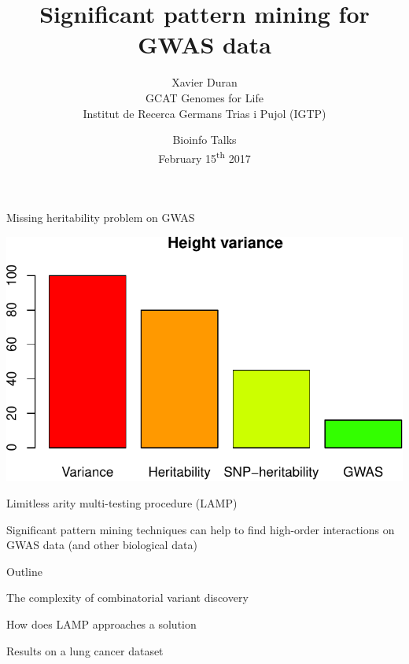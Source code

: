 \documentclass[ignorenonframetext,]{beamer}
\title{Significant pattern mining for GWAS data}
\author{Xavier Duran\\
GCAT Genomes for Life\\
Institut de Recerca Germans Trias i Pujol (IGTP)}
\date{Bioinfo Talks\\
February 15\textsuperscript{th} 2017}
\begin{document}
\frame{\titlepage}

\begin{frame}{Missing heritability problem on GWAS}

\includegraphics{lamplink_files/figure-beamer/unnamed-chunk-1-1.pdf}

\end{frame}

\begin{frame}{Limitless arity multi-testing procedure (LAMP)}

Significant pattern mining techniques can help to find high-order
interactions on GWAS data (and other biological data)

\pause

\begin{block}{Outline}

The complexity of combinatorial variant discovery

\pause

How does LAMP approaches a solution

\pause

Results on a lung cancer dataset

\end{block}

\end{frame}
\end{document}

